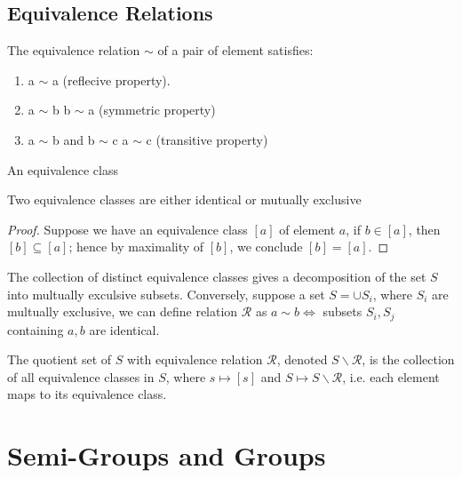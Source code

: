 	\subsection{Equivalence Relations}
		\begin{definition}
		The equivalence relation $\sim$ of a pair of element satisfies:
		\begin{enumerate}
		\item a $\sim$ a (reflecive property).
		\item a $\sim$ b \implies b $\sim$ a (symmetric property)
		\item a $\sim$ b and b $\sim$ c \implies a $\sim$ c (transitive property)
 		\end{enumerate}
		\end{definition}
		\begin{definition}
		An equivalence class 
		\end{definition}
		\begin{theorem}
		Two equivalence classes are either identical or mutually exclusive
		\end{theorem}
		\begin{proof}
		Suppose we have an equivalence class $[a]$ of element $a$, if $b\in [a]$, then $[b]\subseteq[a]$; hence by maximality of $[b]$, we conclude $[b]=[a]$.
		\end{proof}
		\begin{corollary}
		The collection of distinct equivalence classes gives a decomposition of the set $S$ into multually exculsive subsets. Conversely, suppose a set $S=\cup S_i$, where $S_i$ are multually exclusive, we can define relation $\mathcal{R}$ as $a\sim b \iff $ subsets $S_i,S_j$ containing $a,b$ are identical.
		\end{corollary}
		\begin{definition}
		The quotient set of $S$ with equivalence relation $\mathcal{R}$, denoted $S\backslash\mathcal{R}$, is the collection of all equivalence classes in $S$, where $s\mapsto[s]$ and $S\mapsto S\backslash\mathcal{R}$, i.e. each element maps to its equivalence class.
		\end{definition}
	\section{Semi-Groups and Groups}
